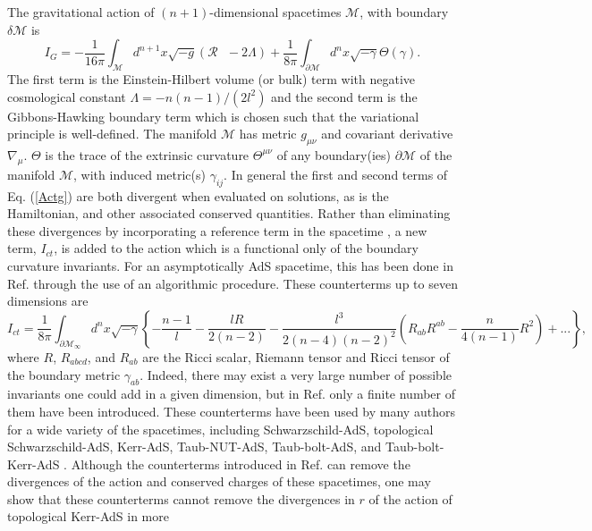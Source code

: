 \documentclass[a4paper,12pt,onecolumn]{revtex4}
\begin{document}
The gravitational action of $(n+1)$-dimensional spacetimes
$\mathcal{M}$, with boundary $\delta \mathcal{M}$ is
\begin{equation}
I_G=-\frac 1{16\pi }\int_{\mathcal{M}}d^{n+1}x\sqrt{-g}\left( \mathcal{R}%
\text{ }-2\Lambda \right) +\frac 1{8\pi }\int_{\partial \mathcal{M}}d^nx%
\sqrt{-\gamma }\Theta (\gamma ).  \label{Actg}
\end{equation}
The first term is the Einstein-Hilbert volume (or bulk) term with
negative cosmological constant $\Lambda =-n(n-1)/(2l^2)$ and the
second term is the Gibbons-Hawking boundary term which is chosen
such that the variational principle is well-defined. The manifold
$\mathcal{M}$ has metric $g_{\mu \nu }$ and covariant derivative
$\nabla _\mu $. $\Theta $ is the trace of the extrinsic curvature
$\Theta ^{\mu \nu }$ of any boundary(ies) $\partial \mathcal{M}$
of the manifold $\mathcal{M}$, with induced metric(s) $\gamma
_{ij}$. In general the first and second terms of Eq. (\ref{Actg})
are both divergent when evaluated on solutions, as is the
Hamiltonian, and other associated conserved quantities. Rather
than eliminating these divergences by incorporating a reference
term in the spacetime \cite{BY,BCM}, a new term, $I_{ct}$, is
added to the action which is a functional only of the boundary
curvature invariants. For an asymptotically AdS spacetime, this
has been done in Ref. \cite{Kls} through the use of an algorithmic
procedure. These counterterms up to seven dimensions are
\begin{equation}
I_{ct}=\frac 1{8\pi }\int_{\partial \mathcal{M}_\infty }d^nx\sqrt{-\gamma }%
\left\{-\frac{n-1}l-\frac{lR}{2(n-2)}-\frac{l^3}{2(n-4)(n-2)^2}%
\left(R_{ab}R^{ab}-\frac n{4(n-1)}R^2\right)+...\right\},
\label{Actct}
\end{equation}
where $R$, $R_{abcd}$, and $R_{ab}$ are the Ricci scalar, Riemann
tensor and Ricci tensor of the boundary metric $\gamma _{ab}$.
Indeed, there may exist a very large number of possible invariants
one could add in a given dimension, but in Ref. \cite{Kls} only a
finite number of them have been introduced. These counterterms
have been used by many authors for a wide variety of the
spacetimes, including Schwarzschild-AdS, topological
Schwarzschild-AdS, Kerr-AdS, Taub-NUT-AdS, Taub-bolt-AdS, and
Taub-bolt-Kerr-AdS \cite {Emp,Mann,Awad}. Although the
counterterms introduced in Ref. \cite{Kls} can remove the
divergences of the action and conserved charges of these
spacetimes, one may show that these counterterms cannot remove the
divergences in $r$ of the action of topological Kerr-AdS in more
\end{document}
